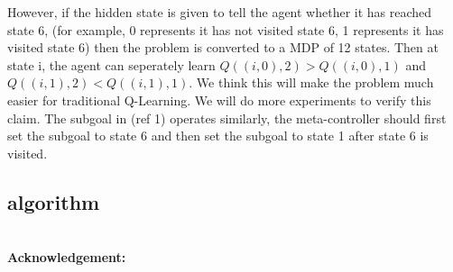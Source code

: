 \documentclass{article}
\newcommand{\Acknowledgement}[1]{\ \\{\bf Acknowledgement:} #1}
\begin{document}
\begin{spacing}{1.1}
    However, if the hidden state is given to tell the agent whether it has reached state 6, (for example, 0 represents it has not visited state 6, 1 represents it has visited state 6) then the problem is converted to a MDP of 12 states. Then at state i, the agent can seperately learn $Q((i, 0), 2) > Q((i, 0), 1)$ and $Q((i, 1), 2) < Q((i, 1), 1)$. We think this will make the problem much easier for traditional Q-Learning. We will do more experiments to verify this claim. The subgoal in (ref 1) operates similarly, the meta-controller should first set the subgoal to state 6 and then set the subgoal to state 1 after state 6 is visited.
    \subsection*{algorithm}
    \Acknowledgement{}


    \end{spacing}
    
\end{document}
